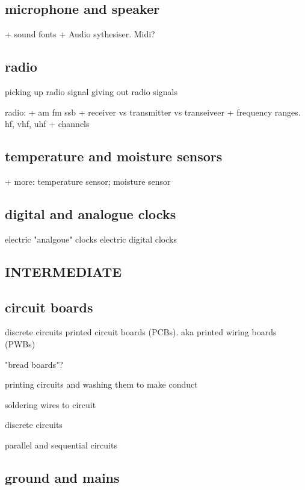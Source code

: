 \subsection{microphone and speaker}

+ sound fonts
+ Audio sythesiser. Midi?

\subsection{radio}

picking up radio signal
giving out radio signals


radio:
+ am fm ssb
+ receiver vs transmitter vs transeiveer
+ frequency ranges. hf, vhf, uhf
+ channels

\subsection{temperature and moisture sensors}

+ more: temperature sensor; moisture sensor

\subsection{digital and analogue clocks}

electric "analgoue" clocks
electric digital clocks

\subsection{INTERMEDIATE}

\subsection{circuit boards}

discrete circuits
printed circuit boards (PCBs). aka printed wiring boards (PWBs)

"bread boards"?

printing circuits and washing them to make conduct

soldering wires to circuit

discrete circuits

parallel and sequential circuits

\subsection{ground and mains}


